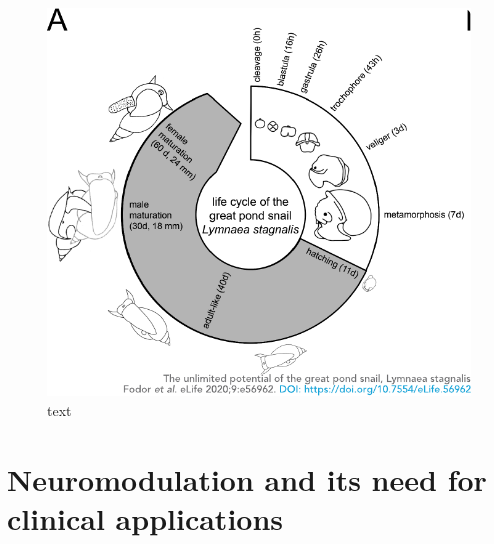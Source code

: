 \begin{figure}[htb!]
	\includegraphics[width=\textwidth]{img/intro/lymnaea_life_cycle.pdf}
	\caption{text}
	\label{fig:lymnaea_life_cycle}
\end{figure}




\section{Neuromodulation and its need for clinical applications}